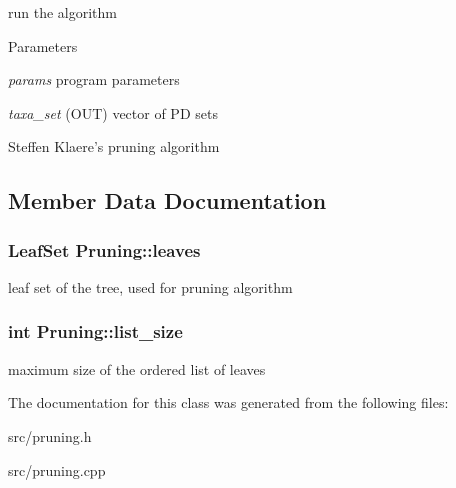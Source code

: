 \label{classPruning_a9ee0d53c821bfca89ebe57f090eeba99}
run the algorithm 
\begin{DoxyParams}{Parameters}
\item[{\em params}]program parameters \item[{\em taxa\_\-set}](OUT) vector of PD sets\end{DoxyParams}
Steffen Klaere's pruning algorithm 

\subsection{Member Data Documentation}
\hypertarget{classPruning_aa7b17e04be84e8605bef199af9c86656}{
\subsubsection[{leaves}]{\setlength{\rightskip}{0pt plus 5cm}LeafSet {\bf Pruning::leaves}}}
\label{classPruning_aa7b17e04be84e8605bef199af9c86656}
leaf set of the tree, used for pruning algorithm \hypertarget{classPruning_a0b7c9c3601f3facb5eeb9b40f4a11059}{
\subsubsection[{list\_\-size}]{\setlength{\rightskip}{0pt plus 5cm}int {\bf Pruning::list\_\-size}}}
\label{classPruning_a0b7c9c3601f3facb5eeb9b40f4a11059}
maximum size of the ordered list of leaves 

The documentation for this class was generated from the following files:\begin{DoxyCompactItemize}
\item 
src/pruning.h\item 
src/pruning.cpp\end{DoxyCompactItemize}
